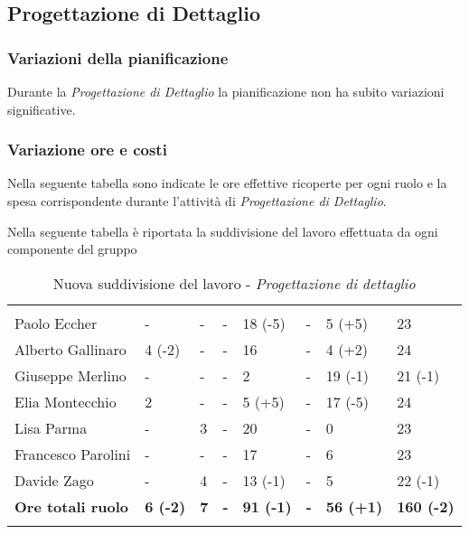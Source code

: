 


\subsection{Progettazione di Dettaglio}
\label{sec:ConsuntivoProgettazioneDettaglio}
\subsubsection{Variazioni della pianificazione}
Durante la \textit{Progettazione di Dettaglio} la pianificazione non ha subito variazioni significative.

\subsubsection{Variazione ore e costi}
Nella seguente tabella sono indicate le ore effettive ricoperte per ogni ruolo e la spesa corrispondente durante l'attività di \textit{Progettazione di Dettaglio}.

Nella seguente tabella è riportata la suddivisione del lavoro effettuata da ogni componente del gruppo


\begin{table}[H]
	\centering
	\begin{tabular}{|C{4.5cm}|C{1cm}|C{1cm}|C{1cm}|C{1cm}|C{1cm}|C{1cm}|C{3cm}|}
		 & & &&&&&\\
		Paolo Eccher      & - & - & - & 18 (-5) & - & 5 (+5) & 23 \\
		\hline
		Alberto Gallinaro & 4 (-2) & - & - & 16 & - & 4 (+2) & 24 \\
		\hline
		Giuseppe Merlino  & - & - & - & 2 & - & 19 (-1) & 21 (-1)\\
		\hline
		Elia Montecchio   & 2 & - & - & 5 (+5) & - & 17 (-5) & 24 \\
		\hline 
		Lisa Parma        & - & 3 & - & 20 & - & 0 & 23 \\
		\hline
		Francesco Parolini& - & - & - & 17 & - & 6 & 23 \\
		\hline
		Davide Zago       & - & 4 & - & 13 (-1) & - & 5 & 22 (-1) \\
		\hline
		\textbf{Ore totali ruolo}  & \textbf{6 (-2)} & \textbf{7} & \textbf{-} & \textbf{91 (-1)} & \textbf{-} & \textbf{56 (+1)} & \textbf{160 (-2)} \\
	\end{tabular}
	\caption{Nuova suddivisione del lavoro - \textit{Progettazione di dettaglio}}
\end{table}



